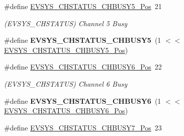 \begin{DoxyCompactItemize}
\item 
\hypertarget{group___s_a_m_l21___e_v_s_y_s_ga4260435f6ac69aade5d5cd4d1ff0498a}{}\#define \hyperlink{group___s_a_m_l21___e_v_s_y_s_ga4260435f6ac69aade5d5cd4d1ff0498a}{E\+V\+S\+Y\+S\+\_\+\+C\+H\+S\+T\+A\+T\+U\+S\+\_\+\+C\+H\+B\+U\+S\+Y5\+\_\+\+Pos}~21\label{group___s_a_m_l21___e_v_s_y_s_ga4260435f6ac69aade5d5cd4d1ff0498a}

\begin{DoxyCompactList}\small\item\em (E\+V\+S\+Y\+S\+\_\+\+C\+H\+S\+T\+A\+T\+U\+S) Channel 5 Busy \end{DoxyCompactList}\item 
\hypertarget{group___s_a_m_l21___e_v_s_y_s_gafee02c35d98647c534f7e1fd8934c5c0}{}\#define {\bfseries E\+V\+S\+Y\+S\+\_\+\+C\+H\+S\+T\+A\+T\+U\+S\+\_\+\+C\+H\+B\+U\+S\+Y5}~(1 $<$$<$ \hyperlink{group___s_a_m_l21___e_v_s_y_s_ga4260435f6ac69aade5d5cd4d1ff0498a}{E\+V\+S\+Y\+S\+\_\+\+C\+H\+S\+T\+A\+T\+U\+S\+\_\+\+C\+H\+B\+U\+S\+Y5\+\_\+\+Pos})\label{group___s_a_m_l21___e_v_s_y_s_gafee02c35d98647c534f7e1fd8934c5c0}

\item 
\hypertarget{group___s_a_m_l21___e_v_s_y_s_ga46fea3af5eecb681dd02b5eac958e087}{}\#define \hyperlink{group___s_a_m_l21___e_v_s_y_s_ga46fea3af5eecb681dd02b5eac958e087}{E\+V\+S\+Y\+S\+\_\+\+C\+H\+S\+T\+A\+T\+U\+S\+\_\+\+C\+H\+B\+U\+S\+Y6\+\_\+\+Pos}~22\label{group___s_a_m_l21___e_v_s_y_s_ga46fea3af5eecb681dd02b5eac958e087}

\begin{DoxyCompactList}\small\item\em (E\+V\+S\+Y\+S\+\_\+\+C\+H\+S\+T\+A\+T\+U\+S) Channel 6 Busy \end{DoxyCompactList}\item 
\hypertarget{group___s_a_m_l21___e_v_s_y_s_ga3d4679cc977aea78243efb0a1eac49e6}{}\#define {\bfseries E\+V\+S\+Y\+S\+\_\+\+C\+H\+S\+T\+A\+T\+U\+S\+\_\+\+C\+H\+B\+U\+S\+Y6}~(1 $<$$<$ \hyperlink{group___s_a_m_l21___e_v_s_y_s_ga46fea3af5eecb681dd02b5eac958e087}{E\+V\+S\+Y\+S\+\_\+\+C\+H\+S\+T\+A\+T\+U\+S\+\_\+\+C\+H\+B\+U\+S\+Y6\+\_\+\+Pos})\label{group___s_a_m_l21___e_v_s_y_s_ga3d4679cc977aea78243efb0a1eac49e6}

\item 
\hypertarget{group___s_a_m_l21___e_v_s_y_s_gadd160959cc215f9816343ce458e9c828}{}\#define \hyperlink{group___s_a_m_l21___e_v_s_y_s_gadd160959cc215f9816343ce458e9c828}{E\+V\+S\+Y\+S\+\_\+\+C\+H\+S\+T\+A\+T\+U\+S\+\_\+\+C\+H\+B\+U\+S\+Y7\+\_\+\+Pos}~23\label{group___s_a_m_l21___e_v_s_y_s_gadd160959cc215f9816343ce458e9c828}


\end{DoxyCompactItemize}
